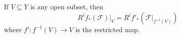 If $V \subseteq Y$ is any open subset, then
$$R^i f_*(\mathcal{F})|_V = R^i f'_*(\mathcal{F}|_{f^{-1}(V)})$$
where $f' : f^{-1}(V) \to V$ is the restricted map.
